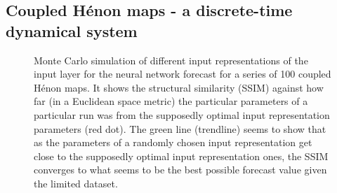 \documentclass[journal]{IEEEtran}
\begin{document}
%
%


\subsection{Coupled H\'{e}non maps - a discrete-time dynamical system}

\begin{figure}[!htb]
\centering
{}
\caption{Monte Carlo simulation of different  input representations of the input layer for the neural network forecast for a series of 100 coupled
H\'{e}non maps.
It shows the structural similarity (SSIM) against how far (in a Euclidean space metric) the particular parameters of a particular
run was from the supposedly optimal  input representation  parameters (red dot). The green line (trendline) seems to show that as the parameters
of a randomly chosen  input representation  get close to the supposedly optimal  input representation  ones, the SSIM converges to what seems to be the
best possible forecast value given the limited dataset.}
\label{MonteCarloSSIMversusParameterMetricDistance100HenonCoupledMaps}
\end{figure}
\end{document}
